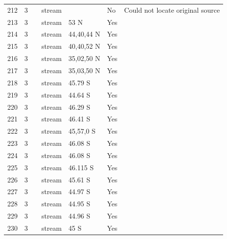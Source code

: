 \documentclass[12pt]{article}
\begin{document}
\begin{landscape}
\begin{table}[h!]
{\begin{tabular}{p{2.8cm}p{1.3cm}p{3cm}p{2.2cm}p{2.5cm}lp{8.2cm}}
        212   & 3 & \cite{Ricker1935}  & stream &       & No    & Could not locate original source \\
        213   & 3 & \cite{Badcock1949}     & stream & 53 N  & Yes  &     \\
        214   & 3 & \cite{Thompson2003}    & stream & 44,40,44 N & Yes  &     \\
        215   & 3 & \cite{Thompson2003}    & stream & 40,40,52 N & Yes  &     \\
        216   & 3 & \cite{Thompson2003}    & stream & 35,02,50 N & Yes  &     \\
        217   & 3 & \cite{Thompson2003}    & stream & 35,03,50 N & Yes  &     \\
        218   & 3 & \cite{Thompson2004c}  & stream & 45.79 S & Yes  &     \\
        219   & 3 & \cite{Thompson2004c}  & stream & 44.64 S & Yes  &     \\
        220   & 3 & \cite{Thompson2004c}  & stream & 46.29 S & Yes  &     \\
        221   & 3 & \cite{Thompson2004c}  & stream & 46.41 S & Yes  &     \\
        222   & 3 & \cite{Thompson2004c}  & stream & 45,57,0 S & Yes  &     \\
        223   & 3 & \cite{Thompson2004c}  & stream & 46.08 S & Yes  &     \\
        224   & 3 & \cite{Thompson2004c}  & stream & 46.08 S & Yes  &     \\
        225   & 3 & \cite{Thompson2004c}  & stream & 46.115 S & Yes  &     \\
        226   & 3 & \cite{Thompson2004c}  & stream & 45.61 S & Yes   &       \\
        227   & 3 & \cite{Thompson2004c}  & stream & 44.97 S & Yes   &       \\
        228   & 3 & \cite{Thompson2004c}  & stream & 44.95 S & Yes   &       \\
        229   & 3 & \cite{Thompson2004c}  & stream & 44.96 S & Yes   &       \\
        230   & 3 & \cite{Thompson2004c}  & stream & 45 S  & Yes   &       \\
        \hline
      \end{tabular}}%
      \end{table}

        \newpage


\end{landscape}
\end{document}
